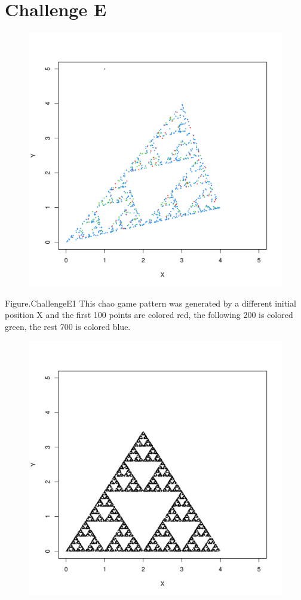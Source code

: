 \documentclass[12pt,a4paper]{article}
\begin{document}
\section{Challenge E}
\begin{figure}[h]
\centering
\includegraphics[width=\textwidth]{challengeE1.pdf}
\end{figure}
Figure.ChallengeE1 This chao game pattern was generated by a different initial position X and 
the first 100 points are colored red, the following 200 is colored green, the rest 700 is colored blue.
\\
\begin{figure}[h]
\centering
\includegraphics[width=\textwidth]{challengeE2.pdf}
\end{figure}
\end{document}
